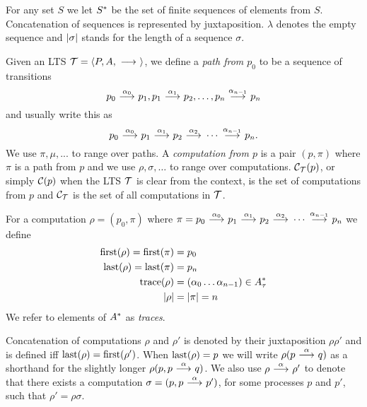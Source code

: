 \begin{definition}
    For any set $S$ we let $S^*$ be the set of finite sequences of elements
    from $S$. Concatenation of sequences is represented by juxtaposition.
    $\lambda$ denotes the empty sequence and $|\sigma|$ stands for the length of a
    sequence $\sigma$.

    Given an LTS $\mathcal{T} = \langle P,A,\ {\stackrel{{}}{\longrightarrow}}\  \rangle$, we define a
    \emph{path from $p_0$} to be a sequence of transitions
    \[
        p_0\ {\stackrel{{\alpha_0}}{\longrightarrow}}\ p_1,
        p_1\ {\stackrel{{\alpha_1}}{\longrightarrow}}\ p_2, \dots ,
        p_n\ {\stackrel{{\alpha_{n-1}}}{\longrightarrow}}\ p_n
    \]
    and usually write this as
    \[
        p_0 \ {\stackrel{{\alpha_0}}{\longrightarrow}}\  p_1
            \ {\stackrel{{\alpha_1}}{\longrightarrow}}\  p_2
            \ {\stackrel{{\alpha_2}}{\longrightarrow}}\  \cdots
            \ {\stackrel{{\alpha_{n-1}}}{\longrightarrow}}\ p_n.
    \]
    We use $\pi,\mu,...$ to range over paths.
    A \emph{computation from $p$} is a pair $(p,\pi)$ where $\pi$ is a path
    from $p$ and
    we use $\rho,\sigma,\dots$ to
    range over computations.
    $\mathcal{C}_{\mathcal{T}}(p)$,
    or simply $\mathcal{C}(p)$ when the LTS $\mathcal{T}$ is clear from the context,
    is the set of computations from $p$ and
    $\mathcal{C}_{\mathcal{T}}$ is the set of all computations in $\mathcal{T}$.

    For a computation $\rho = (p_0,\pi)$
    where $\pi = p_0 \ {\stackrel{{\alpha_0}}{\longrightarrow}}\  p_1 \ {\stackrel{{\alpha_1}}{\longrightarrow}}\  p_2 \ {\stackrel{{\alpha_2}}{\longrightarrow}}\ 
    \cdots \ {\stackrel{{\alpha_{n-1}}}{\longrightarrow}}\ p_n$ we define
    \begin{align*}
        \operatorname{first}(\rho) = \operatorname{first}(\pi) &= p_0 \\
        \operatorname{last}(\rho) = \operatorname{last}(\pi) &= p_n \\
        \operatorname{trace}(\rho) &= (\alpha_0\dots\alpha_{n-1}) \in A_\tau^* \\
        |\rho| &= |\pi| = n
    \end{align*}
    We refer to elements of $A^*$
    as \emph{traces}. 

    Concatenation of computations $\rho$ and $\rho'$
    is denoted by their juxtaposition
    $\rho\rho'$ and is defined iff $\operatorname{last}(\rho)=\operatorname{first}(\rho')$.
    When $\operatorname{last}(\rho) = p$ we will
    write $\rho(p\ {\stackrel{{\alpha}}{\longrightarrow}}\  q)$ as a shorthand for the slightly longer
    $\rho(p, p\ {\stackrel{{\alpha}}{\longrightarrow}}\  q)$.
    We also use $\rho \ {\stackrel{{\alpha}}{\longrightarrow}}\  \rho'$ to denote that
    there exists a computation
    $\sigma = (p, p \ {\stackrel{{\alpha}}{\longrightarrow}}\  p')$, for some processes $p$ and $p'$,
    such that $\rho' = \rho\sigma$.
\end{definition}

